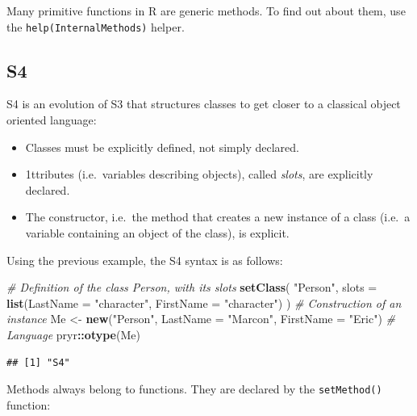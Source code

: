 \documentclass[
  12pt,
  american,
  a4paper,
  extrafontsizes,onecolumn,openright
  ]{memoir}
\newenvironment{Shaded}{\begin{snugshade}}{\end{snugshade}}
\newcommand{\AttributeTok}[1]{\textcolor[rgb]{0.13,0.29,0.53}{#1}}
\newcommand{\CommentTok}[1]{\textcolor[rgb]{0.56,0.35,0.01}{\textit{#1}}}
\newcommand{\FunctionTok}[1]{\textcolor[rgb]{0.13,0.29,0.53}{\textbf{#1}}}
\newcommand{\NormalTok}[1]{#1}
\newcommand{\OtherTok}[1]{\textcolor[rgb]{0.56,0.35,0.01}{#1}}
\newcommand{\SpecialCharTok}[1]{\textcolor[rgb]{0.81,0.36,0.00}{\textbf{#1}}}
\newcommand{\StringTok}[1]{\textcolor[rgb]{0.31,0.60,0.02}{#1}}
\providecommand{\tightlist}{%
  \setlength{\itemsep}{0pt}\setlength{\parskip}{0pt}}
\begin{document}
Many primitive functions in R are generic methods.
To find out about them, use the \texttt{help(InternalMethods)} helper.

\subsection{S4}\label{s4}

S4 is an evolution of S3 that structures classes to get closer to a classical object oriented language:

\begin{itemize}
\tightlist
\item
  Classes must be explicitly defined, not simply declared.
\item
  1ttributes (i.e.~variables describing objects), called \emph{slots}, are explicitly declared.
\item
  The constructor, i.e.~the method that creates a new instance of a class (i.e.~a variable containing an object of the class), is explicit.
\end{itemize}

Using the previous example, the S4 syntax is as follows:

\scriptsize

\begin{Shaded}
\begin{Highlighting}[]
\CommentTok{\# Definition of the class Person, with its slots}
\FunctionTok{setClass}\NormalTok{(}
  \StringTok{"Person"}\NormalTok{,  }
  \AttributeTok{slots =} \FunctionTok{list}\NormalTok{(}\AttributeTok{LastName =} \StringTok{"character"}\NormalTok{, }\AttributeTok{FirstName =} \StringTok{"character"}\NormalTok{)}
\NormalTok{)}
\CommentTok{\#  Construction of an instance}
\NormalTok{Me }\OtherTok{\textless{}{-}} \FunctionTok{new}\NormalTok{(}\StringTok{"Person"}\NormalTok{, }\AttributeTok{LastName =} \StringTok{"Marcon"}\NormalTok{, }\AttributeTok{FirstName =} \StringTok{"Eric"}\NormalTok{)}
\CommentTok{\# Language}
\NormalTok{pryr}\SpecialCharTok{::}\FunctionTok{otype}\NormalTok{(Me)}
\end{Highlighting}
\end{Shaded}

\begin{verbatim}
## [1] "S4"
\end{verbatim}

\normalsize

Methods always belong to functions.
They are declared by the \texttt{setMethod()} function:
\end{document}
